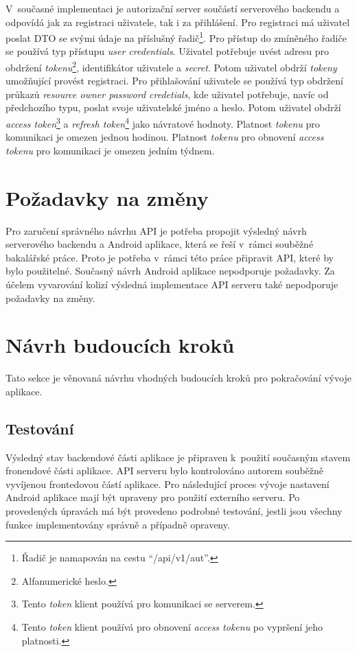         V~současné implementaci je autorizační server součástí serverového backendu a odpovídá jak za registraci uživatele, tak i za přihlášení. Pro registraci má uživatel poslat DTO se svými údaje na příslušný řadič\footnote{Řadič je namapován na cestu \enquote{/api/v1/aut}.}. Pro přístup do zmíněného řadiče se používá typ přístupu \textit{user credentials}. Uživatel potřebuje uvést adresu pro obdržení \textit{tokenu}\footnote{Alfanumerické heslo.}, identifikátor uživatele a \textit{secret}. Potom uživatel obdrží \textit{tokeny} umožňující provést registraci.
        Pro přihlašování uživatele se používá typ obdržení průkazů \textit{resource owner password credetials}, kde uživatel potřebuje, navíc od předchozího typu, poslat svoje uživatelské jméno a heslo. Potom uživatel obdrží \textit{access token}\footnote{Tento \textit{token} klient používá pro komunikaci se serverem.} a \textit{refresh token}\footnote{Tento \textit{token} klient používá pro obnovení \textit{access tokenu} po vypršení jeho platnosti.} jako návratové hodnoty. Platnost \textit{tokenu} pro komunikaci je omezen jednou hodinou. Platnost \textit{tokenu} pro obnovení \textit{access tokenu} pro komunikaci je omezen jedním týdnem.
        
    \section{Požadavky na změny}
        Pro zaručení správného návrhu API je potřeba propojit výsledný návrh serverového backendu a Android aplikace, která se řeší v~rámci souběžné bakalářské práce. Proto je potřeba v~rámci této  práce připravit API, které by bylo použitelné. Současný návrh Android aplikace nepodporuje požadavky. Za účelem vyvarování kolizí výsledná implementace API serveru také nepodporuje požadavky na změny.

\section{Návrh budoucích kroků}
    Tato sekce je věnovaná návrhu vhodných budoucích kroků pro pokračování vývoje aplikace.
    
    \subsection{Testování}
        Výsledný stav backendové části aplikace je připraven k~použití současným stavem fronendové části aplikace. API serveru bylo kontrolováno autorem souběžně vyvíjenou frontedovou částí aplikace. Pro následující proces vývoje nastavení Android aplikace mají být upraveny pro použití externího serveru. Po provedených úpravách má být provedeno podrobné testování, jestli jsou všechny funkce implementovány správně a případně opraveny.
    
